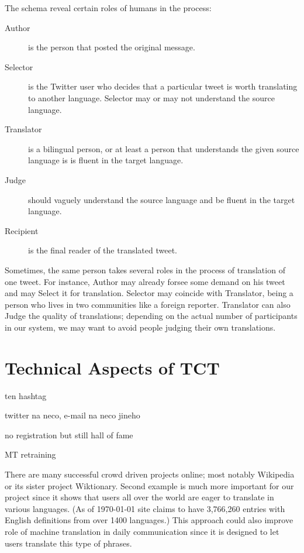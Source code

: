 The schema reveal certain roles of humans in the process:

\begin{description}
\item[Author] is the person that posted the original message.
\item[Selector] is the Twitter user who decides that a particular tweet is worth
translating to another language. Selector may or may not understand the source
language.
\item[Translator] is a bilingual person, or at least a person that understands
the given source language is is fluent in the target language.
\item[Judge] should vaguely understand the source language and be fluent in the
target language.
\item[Recipient] is the final reader of the translated tweet.
\end{description}

Sometimes, the same person takes several roles in the process of translation of
one tweet. For instance, Author may already forsee some demand on his tweet and
may Select it for translation. Selector may coincide with Translator, being a
person who lives in two communities like a foreign reporter. Translator can also
Judge the quality of translations; depending on the actual number of 
participants in our system, we may want to avoid people judging their own
translations.



\section{Technical Aspects of TCT}
\label{implementation}

ten hashtag

twitter na neco, e-mail na neco jineho

no registration but still hall of fame

MT retraining

There are many successful crowd driven projects online; most notably Wikipedia
or its sister project Wiktionary. Second example is much more important for our
project since it shows that users all over the world are eager to translate in
various languages. (As of \today{ }site claims to have 3,766,260 entries with
English definitions from over 1400 languages.) This approach could also improve
role of machine translation in daily communication since it is designed to let
users translate this type of phrases.
%
